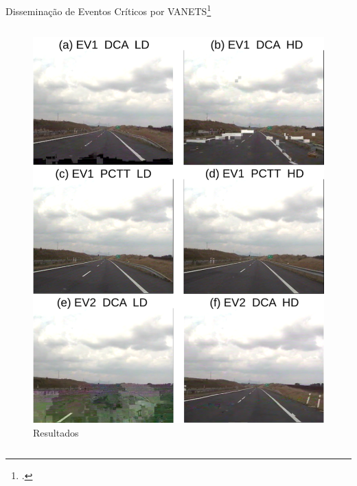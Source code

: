\begin{frame}{Disseminação de Eventos Críticos por VANETS\footcite{Andrade2021a,Andrade2021b}}
\begin{columns}
\begin{column}{0.35\textwidth}
\begin{figure}
                \includegraphics[width=0.9\linewidth]{figs/minuet_video.png}
                \caption{Resultados}
            \end{figure}
        \end{column}
    \end{columns}
\end{frame}

